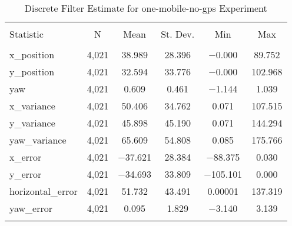 
\begin{table}[h] \centering 
  \caption{Discrete Filter Estimate for one-mobile-no-gps Experiment} 
  \label{tab:one_mobile_no_gps_discrete_summary} 
\begin{tabular}{@{\extracolsep{5pt}}lccccc} 
\\[-1.8ex]\hline 
\hline \\[-1.8ex] 
Statistic & \multicolumn{1}{c}{N} & \multicolumn{1}{c}{Mean} & \multicolumn{1}{c}{St. Dev.} & \multicolumn{1}{c}{Min} & \multicolumn{1}{c}{Max} \\ 
\hline \\[-1.8ex] 
x\_position & 4,021 & 38.989 & 28.396 & $-$0.000 & 89.752 \\ 
y\_position & 4,021 & 32.594 & 33.776 & $-$0.000 & 102.968 \\ 
yaw & 4,021 & 0.609 & 0.461 & $-$1.144 & 1.039 \\ 
x\_variance & 4,021 & 50.406 & 34.762 & 0.071 & 107.515 \\ 
y\_variance & 4,021 & 45.898 & 45.190 & 0.071 & 144.294 \\ 
yaw\_variance & 4,021 & 65.609 & 54.808 & 0.085 & 175.766 \\ 
x\_error & 4,021 & $-$37.621 & 28.384 & $-$88.375 & 0.030 \\ 
y\_error & 4,021 & $-$34.693 & 33.809 & $-$105.101 & 0.000 \\ 
horizontal\_error & 4,021 & 51.732 & 43.491 & 0.00001 & 137.319 \\ 
yaw\_error & 4,021 & 0.095 & 1.829 & $-$3.140 & 3.139 \\ 
\hline \\[-1.8ex] 
\end{tabular} 
\end{table} 

